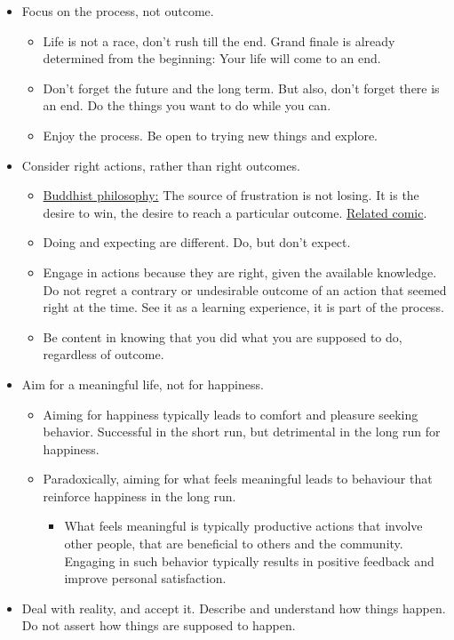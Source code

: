 \documentclass[
]{book}
\providecommand{\tightlist}{%
  \setlength{\itemsep}{0pt}\setlength{\parskip}{0pt}}
\begin{document}
\begin{itemize}
\tightlist
\item
  Focus on the process, not outcome.

  \begin{itemize}
  \tightlist
  \item
    Life is not a race, don't rush till the end. Grand finale is already determined from the beginning: Your life will come to an end.
  \item
    Don't forget the future and the long term. But also, don't forget there is an end. Do the things you want to do while you can.
  \item
    Enjoy the process. Be open to trying new things and explore.
  \end{itemize}
\item
  Consider right actions, rather than right outcomes.

  \begin{itemize}
  \tightlist
  \item
    \href{https://en.wikipedia.org/wiki/Buddhist_philosophy}{Buddhist philosophy:} The source of frustration is not losing. It is the desire to win, the desire to reach a particular outcome. \href{https://existentialcomics.com/comic/102}{Related comic}.
  \item
    Doing and expecting are different. Do, but don't expect.
  \item
    Engage in actions because they are right, given the available knowledge. Do not regret a contrary or undesirable outcome of an action that seemed right at the time. See it as a learning experience, it is part of the process.\\
  \item
    Be content in knowing that you did what you are supposed to do, regardless of outcome.
  \end{itemize}
\item
  Aim for a meaningful life, not for happiness.

  \begin{itemize}
  \tightlist
  \item
    Aiming for happiness typically leads to comfort and pleasure seeking behavior. Successful in the short run, but detrimental in the long run for happiness.
  \item
    Paradoxically, aiming for what feels meaningful leads to behaviour that reinforce happiness in the long run.

    \begin{itemize}
    \tightlist
    \item
      What feels meaningful is typically productive actions that involve other people, that are beneficial to others and the community. Engaging in such behavior typically results in positive feedback and improve personal satisfaction.
    \end{itemize}
  \end{itemize}
\item
  Deal with reality, and accept it. Describe and understand how things happen. Do not assert how things are supposed to happen.


\end{itemize}
\end{document}
